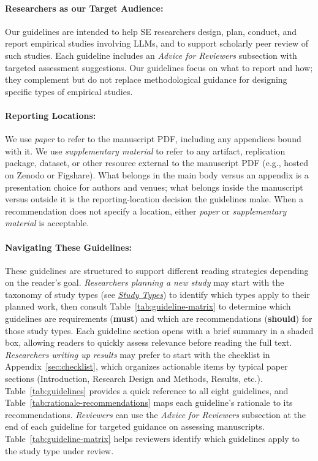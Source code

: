 \documentclass[smallextended]{svjour3}
\newif\ifpaper\papertrue
\newcommand{\must}{\textbf{must}\xspace}
\newcommand{\should}{\textbf{should}\xspace}
\newcommand{\paper}{\emph{paper}\xspace}
\newcommand{\supplementarymaterial}{\emph{supplementary material}\xspace}
\newcommand{\paper}{\emph{paper}\xspace}
\newcommand{\supplementarymaterial}{\emph{supplementary material}\xspace}
\newcommand{\studytypes}{\hyperref[sec:study-types]{\emph{Study Types}}\xspace}
\newcommand{\studytypes}{\href{/study-types}{\emph{Study Types}}\xspace}
\newcommand{\scopeparagraph}[1]{\paragraph{\bfseries #1:}}
\newcommand{\scopeparagraph}[1]{\subsubsection{#1}}
\begin{document}
\scopeparagraph{Researchers as our Target Audience}

Our guidelines are intended to help SE researchers design, plan, conduct,
and report empirical studies involving LLMs, and to support scholarly peer
review of such studies. Each guideline includes an \emph{Advice for
Reviewers} subsection with targeted assessment suggestions.
Our guidelines focus on what to report and how; they complement but do not replace methodological guidance for designing specific types of empirical studies.

\scopeparagraph{Reporting Locations}

We use \paper to refer to the manuscript PDF, including any appendices bound with it. We use \supplementarymaterial to refer to any artifact, replication package, dataset, or other resource external to the manuscript PDF (e.g., hosted on Zenodo or Figshare). What belongs in the main body versus an appendix is a presentation choice for authors and venues; what belongs inside the manuscript versus outside it is the reporting-location decision the guidelines make. When a recommendation does not specify a location, either \paper or \supplementarymaterial is acceptable.

\scopeparagraph{Navigating These Guidelines}

These guidelines are structured to support different reading strategies depending on the reader's goal. \emph{Researchers planning a new study} may start with the taxonomy of study types (see \studytypes) to identify which types apply to their planned work, then consult \ifpaper Table~\ref{tab:guideline-matrix} \else the \href{/guidelines/\#guidelines-by-study-type}{applicability matrix} \fi to determine which guidelines are requirements (\must) and which are recommendations (\should) for those study types. Each guideline section opens with a brief summary in a shaded box, allowing readers to quickly assess relevance before reading the full text. \emph{Researchers writing up results} may prefer to start with the \ifpaper checklist in Appendix~\ref{sec:checklist}, \else \href{/checklist/}{checklist}, \fi which organizes actionable items by typical paper sections (Introduction, Research Design and Methods, Results, etc.). \ifpaper Table~\ref{tab:guidelines} provides a quick reference to all eight guidelines, and Table~\ref{tab:rationale-recommendations} maps each guideline's rationale to its recommendations. \fi \emph{Reviewers} can use the \emph{Advice for Reviewers} subsection at the end of each guideline for targeted guidance on assessing manuscripts. \ifpaper Table~\ref{tab:guideline-matrix} helps reviewers identify which guidelines apply to the study type under review. \fi 
\end{document}
